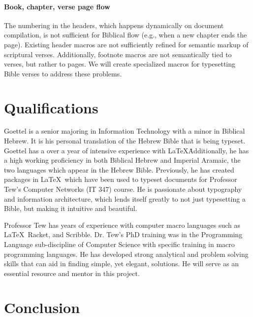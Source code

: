 \documentclass{acm_proc_article-sp}
\begin{document}
\paragraph{Book, chapter, verse page flow}
The numbering in the headers, which happens dynamically on document compilation, is not sufficient for Biblical flow (e.g., when a new chapter ends the page). Existing header macros are not sufficiently refined for semantic markup of scriptural verses. Additionally, footnote macros are not semantically tied to verses, but rather to pages. We will create specialized macros for typesetting Bible verses to address these problems.

\section{Qualifications}
Goettel is a senior majoring in Information Technology with a minor in Biblical Hebrew. It is his personal translation of the Hebrew Bible that is being typeset. Goettel has a over a year of intensive experience with \LaTeX\. Additionally, he has a high working proficiency in both Biblical Hebrew and Imperial Aramaic, the two languages which appear in the Hebrew Bible. Previously, he has created packages in \LaTeX\ which have been used to typeset documents for Professor Tew's Computer Networks (IT 347) course. He is passionate about typography and information architecture, which lends itself greatly to not just typesetting a Bible, but making it intuitive and beautiful.

Professor Tew has years of experience with computer macro languages such as \LaTeX\ Racket, and Scribble. Dr. Tew's PhD training was in the Programming Language sub-discipline of Computer Science with specific training in macro programming languages. He has developed strong analytical and problem solving skills that can aid in finding simple, yet elegant, solutions. He will serve as an essential resource and mentor in this project.

\section{Conclusion}


\end{document}
